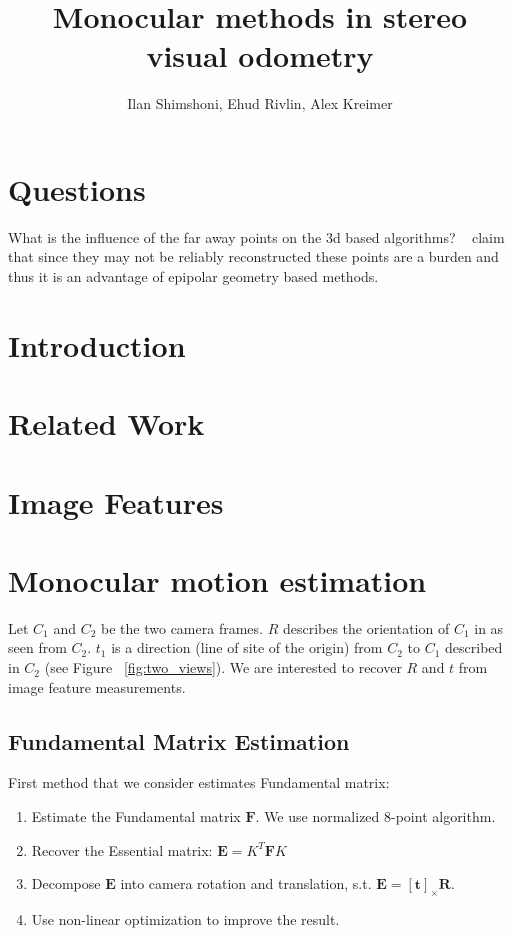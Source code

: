 \documentclass[10pt]{article}         %
\title{Monocular methods in stereo visual odometry}
\author{Ilan Shimshoni, Ehud Rivlin, Alex Kreimer}
\begin{document}
\maketitle


\section{Questions}
What is the influence of the far away points on the 3d based
algorithms?  ~\cite{tardif2008monocular} claim that since they may not
be reliably reconstructed these points are a burden and thus it is an
advantage of epipolar geometry based methods.

\section{Introduction}

\section{Related Work}

\section{Image Features}

\section{Monocular motion estimation}\label{sec:mono_odo}
Let $C_1$ and $C_2$ be the two camera frames.  $R$ describes the
orientation of $C_1$ in as seen from $C_2$. $t_1$ is a direction (line
of site of the origin) from $C_2$ to $C_1$ described in $C_2$ (see
Figure ~\ref{fig:two_views}).  We are interested to recover $R$ and
$t$ from image feature measurements.

\subsection{Fundamental Matrix Estimation}
First method that we consider estimates Fundamental matrix:
\begin{enumerate}
\item Estimate the Fundamental matrix $\mathbf{F}$. We use normalized 8-point algorithm.
\item Recover the Essential matrix: $\mathbf{E} = K^T\mathbf{F}K$
\item Decompose $\mathbf{E}$ into camera rotation and translation, s.t. $\mathbf{E} = [\mathbf{t}]_\times\mathbf{R}$.
\item Use non-linear optimization to improve the result.
\end{enumerate}
\end{document}
